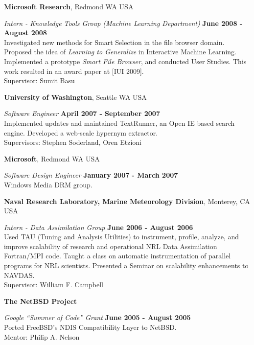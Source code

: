 \documentclass[margin,line]{res}
\begin{document}
\begin{resume}
{\bf Microsoft Research},
Redmond WA USA

\vspace{-.3cm}
{\em Intern - Knowledge Tools Group (Machine Learning Department)} \hfill {\bf June 2008 - August 2008}\\
Investigated new methods for Smart Selection in the file browser domain.  
Proposed the idea of {\em Learning to Generalize} in Interactive Machine
Learning.  Implemented a prototype {\em Smart File Browser}, and conducted User Studies.
This work resulted in an award paper at [IUI 2009].\\
Supervisor: Sumit Basu


{\bf University of Washington},
Seattle WA USA

\vspace{-.3cm}
{\em Software Engineer} \hfill {\bf April 2007 - September 2007}\\
Implemented updates and maintained {\sc TextRunner}, an Open IE based search
engine.  Developed a web-scale hypernym extractor.\\
Supervisors: Stephen Soderland, Oren Etzioni

{\bf Microsoft}, 
Redmond WA USA

\vspace{-.3cm}
{\em Software Design Engineer} \hfill {\bf January 2007 - March 2007}\\
Windows Media DRM group.

{\bf Naval Research Laboratory, Marine Meteorology Division},
Monterey, CA USA

\vspace{-.3cm}
{\em Intern - Data Assimilation Group} \hfill {\bf June 2006 - August 2006}\\
Used TAU (Tuning and Analysis Utilities) to instrument, profile, analyze,
and improve scalability of research and operational NRL Data Assimilation 
Fortran/MPI code.  Taught a class on automatic instrumentation of parallel 
programs for NRL scientists.  Presented a Seminar on scalability enhancements
to NAVDAS.\\
Supervisor: William F. Campbell

{\bf The NetBSD Project}

\vspace{-.3cm}
{\em Google ``Summer of Code'' Grant} \hfill {\bf June 2005 - August 2005}\\
Ported FreeBSD's NDIS Compatibility Layer to NetBSD. \\
Mentor: Philip A. Nelson


\end{resume}
\end{document}
